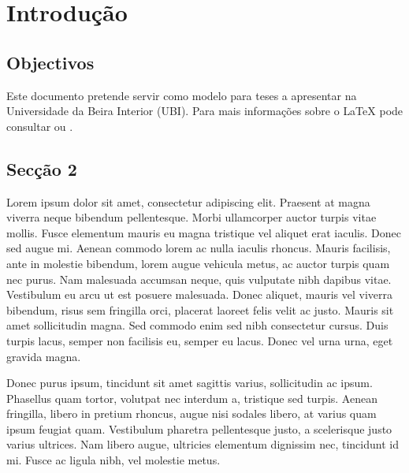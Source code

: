 \chapter{Introdução} \label{chap:int}



\section{Objectivos}
Este documento pretende servir como modelo para teses a apresentar na Universidade da Beira Interior (UBI). Para mais informações sobre o {\LaTeX} pode consultar \cite{short} ou \cite{eprojects}.

\section{Secção 2} \label{sec2}
Lorem ipsum dolor sit amet, consectetur adipiscing elit. Praesent at magna viverra neque bibendum pellentesque. Morbi ullamcorper auctor turpis vitae mollis. Fusce elementum mauris eu magna tristique vel aliquet erat iaculis. Donec sed augue mi. Aenean commodo lorem ac nulla iaculis rhoncus. Mauris facilisis, ante in molestie bibendum, lorem augue vehicula metus, ac auctor turpis quam nec purus. Nam malesuada accumsan neque, quis vulputate nibh dapibus vitae. Vestibulum eu arcu ut est posuere malesuada. Donec aliquet, mauris vel viverra bibendum, risus sem fringilla orci, placerat laoreet felis velit ac justo. Mauris sit amet sollicitudin magna. Sed commodo enim sed nibh consectetur cursus. Duis turpis lacus, semper non facilisis eu, semper eu lacus. Donec vel urna urna, eget gravida magna.

Donec purus ipsum, tincidunt sit amet sagittis varius, sollicitudin ac ipsum. Phasellus quam tortor, volutpat nec interdum a, tristique sed turpis. Aenean fringilla, libero in pretium rhoncus, augue nisi sodales libero, at varius quam ipsum feugiat quam. Vestibulum pharetra pellentesque justo, a scelerisque justo varius ultrices. Nam libero augue, ultricies elementum dignissim nec, tincidunt id mi. Fusce ac ligula nibh, vel molestie metus. 

